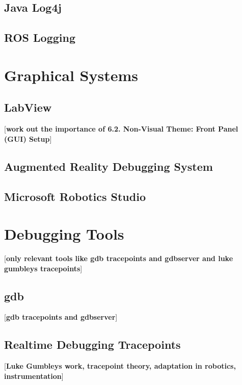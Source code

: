 \subsection{Java Log4j}
\subsection{ROS Logging}

\section{Graphical Systems}
\subsection{LabView}
[\textbf{work out the importance of 6.2. Non-Visual Theme: Front Panel (GUI) Setup}]
\cite{Whitley2001}
\subsection{Augmented Reality Debugging System}
\cite{Collett2010}
\subsection{Microsoft Robotics Studio}
\cite{Jackson2007}

\section{Debugging Tools}
[\textbf{only relevant tools like gdb tracepoints and gdbserver and luke gumbleys tracepoints}]
\subsection{gdb}
[\textbf{gdb tracepoints and gdbserver}]
\subsection{Realtime Debugging Tracepoints}
[\textbf{Luke Gumbleys work, tracepoint theory, adaptation in robotics, instrumentation}]
\cite{Gumbley2009}

